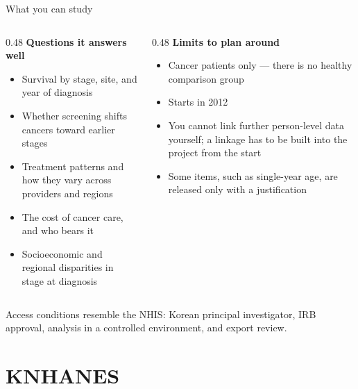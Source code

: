 \documentclass[aspectratio=169,11pt]{beamer}
\begin{document}
\begin{frame}{What you can study}
  \begin{columns}[T]
    \begin{column}{0.48\textwidth}
      \textbf{\color{kdgreen}Questions it answers well}
      \begin{itemize}\small
        \setlength{\itemsep}{6pt}
        \item Survival by stage, site, and year of diagnosis
        \item Whether screening shifts cancers toward earlier stages
        \item Treatment patterns and how they vary across providers and regions
        \item The cost of cancer care, and who bears it
        \item Socioeconomic and regional disparities in stage at diagnosis
      \end{itemize}
    \end{column}
    \begin{column}{0.48\textwidth}
      \textbf{\color{kdaccent}Limits to plan around}
      \begin{itemize}\small
        \setlength{\itemsep}{6pt}
        \item Cancer patients only --- there is no healthy comparison group
        \item Starts in 2012
        \item You cannot link further person-level data yourself; a linkage has to be
              built into the project from the start
        \item Some items, such as single-year age, are released only with a
              justification
      \end{itemize}
    \end{column}
  \end{columns}
  \vspace{5pt}
  {\small Access conditions resemble the NHIS: Korean principal investigator,
  IRB approval, analysis in a controlled environment, and export review.}
\end{frame}

\section{KNHANES}
\end{document}
